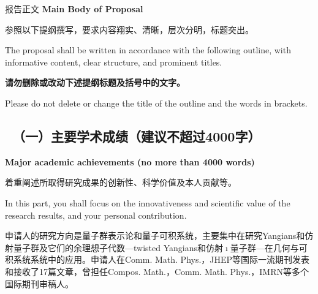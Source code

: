\documentclass[12pt,UTF8,AutoFakeBold=4,a4paper]{ctexart}
\begin{document}
\begin{center}
{\sanhao {} 报告正文 
\bfseries {} Main Body of Proposal}
\end{center}

{\sihao \kaishu  
参照以下提纲撰写，要求内容翔实、清晰，层次分明，标题突出。}

\bigskip

{\sihao {} The proposal shall be written in accordance with the following outline, with informative content, clear structure, and prominent titles.}

\bigskip

{\sihao \kaishu \color{MsBlue} \bfseries 请勿删除或改动下述提纲标题及括号中的文字。}

\bigskip

{\sihao \color{MsBlue}  Please do not delete or change the title of the outline and the words in brackets.}



{\color{MsBlue} \subsection{\sihao \kaishu \qquad \ 
\textbf{（一）主要学术成绩}{\normalfont（建议不超过4000字）}}}


{\color{MsBlue} \xiaosihao {} 
\textbf{Major academic achievements (no more than 4000 words)}}

\medskip

{\sihao \kaishu \color{MsBlue} 着重阐述所取得研究成果的创新性、科学价值及本人贡献等。}

\medskip

{\color{MsBlue} \xiaosihao {} In this part, you shall focus on the innovativeness and scientific value of the research results, and your personal contribution.}

% 
% 


申请人的研究方向是量子群表示论和量子可积系统，主要集中在研究Yangians和仿射量子群及它们的余理想子代数---twisted Yangians和仿射$\imath$量子群---在几何与可积系统系统中的应用。申请人在Comm. Math. Phys.，JHEP等国际一流期刊发表和接收了17篇文章，曾担任Compos. Math.，Comm. Math. Phys.，IMRN等多个国际期刊审稿人。
\end{document}
